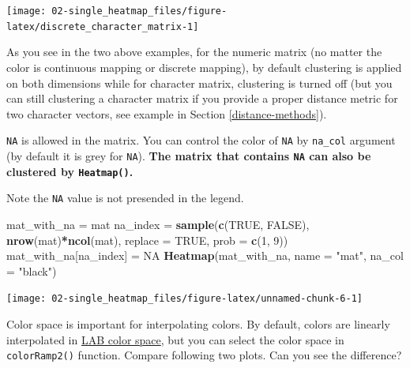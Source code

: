 \documentclass[]{book}
\newenvironment{Shaded}{\begin{snugshade}}{\end{snugshade}}
\newcommand{\KeywordTok}[1]{\textcolor[rgb]{0.13,0.29,0.53}{\textbf{#1}}}
\newcommand{\DataTypeTok}[1]{\textcolor[rgb]{0.13,0.29,0.53}{#1}}
\newcommand{\DecValTok}[1]{\textcolor[rgb]{0.00,0.00,0.81}{#1}}
\newcommand{\StringTok}[1]{\textcolor[rgb]{0.31,0.60,0.02}{#1}}
\newcommand{\OtherTok}[1]{\textcolor[rgb]{0.56,0.35,0.01}{#1}}
\newcommand{\OperatorTok}[1]{\textcolor[rgb]{0.81,0.36,0.00}{\textbf{#1}}}
\newcommand{\NormalTok}[1]{#1}
\theoremstyle{definition}
\theoremstyle{definition}
\theoremstyle{definition}
\theoremstyle{remark}
\begin{document}
\begin{center}\texttt{[image: 02-single\_heatmap\_files/figure-latex/discrete\_character\_matrix-1]} \end{center}

As you see in the two above examples, for the numeric matrix (no matter
the color is continuous mapping or discrete mapping), by default
clustering is applied on both dimensions while for character matrix,
clustering is turned off (but you can still clustering a character
matrix if you provide a proper distance metric for two character
vectors, see example in Section \ref{distance-methods}).

\texttt{NA} is allowed in the matrix. You can control the color of
\texttt{NA} by \texttt{na\_col} argument (by default it is grey for
\texttt{NA}). \textbf{The matrix that contains \texttt{NA} can also be
clustered by \texttt{Heatmap()}.}

Note the \texttt{NA} value is not presended in the legend.

\begin{Shaded}
\begin{Highlighting}[]
\NormalTok{mat_with_na =}\StringTok{ }\NormalTok{mat}
\NormalTok{na_index =}\StringTok{ }\KeywordTok{sample}\NormalTok{(}\KeywordTok{c}\NormalTok{(}\OtherTok{TRUE}\NormalTok{, }\OtherTok{FALSE}\NormalTok{), }\KeywordTok{nrow}\NormalTok{(mat)}\OperatorTok{*}\KeywordTok{ncol}\NormalTok{(mat), }\DataTypeTok{replace =} \OtherTok{TRUE}\NormalTok{, }\DataTypeTok{prob =} \KeywordTok{c}\NormalTok{(}\DecValTok{1}\NormalTok{, }\DecValTok{9}\NormalTok{))}
\NormalTok{mat_with_na[na_index] =}\StringTok{ }\OtherTok{NA}
\KeywordTok{Heatmap}\NormalTok{(mat_with_na, }\DataTypeTok{name =} \StringTok{"mat"}\NormalTok{, }\DataTypeTok{na_col =} \StringTok{"black"}\NormalTok{)}
\end{Highlighting}
\end{Shaded}

\begin{center}\texttt{[image: 02-single\_heatmap\_files/figure-latex/unnamed-chunk-6-1]} \end{center}

Color space is important for interpolating colors. By default, colors
are linearly interpolated in
\href{https://en.wikipedia.org/wiki/Lab_color_space}{LAB color space},
but you can select the color space in \texttt{colorRamp2()} function.
Compare following two plots. Can you see the difference?
\end{document}
